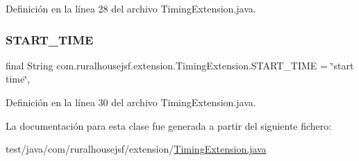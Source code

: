 Definición en la línea 28 del archivo Timing\+Extension.\+java.

\mbox{\label{classcom_1_1ruralhousejsf_1_1extension_1_1_timing_extension_ad283289939c7b6e42277a8b06db6a765}} 
\subsubsection{\texorpdfstring{START\_TIME}{START\_TIME}}
{\footnotesize\ttfamily final String com.\+ruralhousejsf.\+extension.\+Timing\+Extension.\+S\+T\+A\+R\+T\+\_\+\+T\+I\+ME = \char`\"{}start time\char`\"{}\hspace{0.3cm}{\ttfamily [static]}, {\ttfamily [private]}}



Definición en la línea 30 del archivo Timing\+Extension.\+java.



La documentación para esta clase fue generada a partir del siguiente fichero\+:\begin{DoxyCompactItemize}
\item 
test/java/com/ruralhousejsf/extension/\mbox{\hyperlink{_timing_extension_8java}{Timing\+Extension.\+java}}\end{DoxyCompactItemize}

